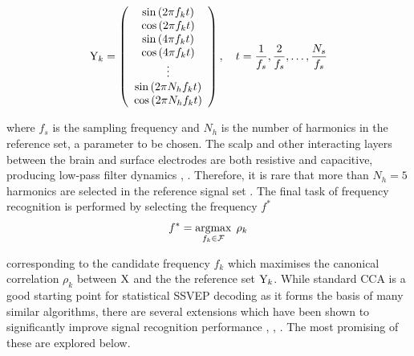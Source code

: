 \begin{equation}
{\textrm{Y}}_{k}=\left(\begin{array}{c}
\sin \left(2 \pi f_{k} t\right) \\
\cos \left(2 \pi f_{k} t\right) \\
\sin \left(4 \pi f_{k} t\right) \\
\cos \left(4 \pi f_{k} t\right) \\
\vdots \\
\sin \left(2 \pi N_h f_{k} t\right) \\
\cos \left(2 \pi N_h f_{k} t\right)
\end{array}\right), \quad t=\frac{1}{f_s}, \frac{2}{f_s}, \ldots, \frac{N_s}{f_s}
\label{eq:sinusoidal-ref}
\end{equation}

where $f_s$ is the sampling frequency and $N_h$ is the number of harmonics in the reference set, a parameter to be chosen. The scalp and other interacting layers between the brain and surface electrodes are both resistive and capacitive, producing low-pass filter dynamics \cite{baillet-em-brain-mapping}, \cite{lin-cca-2006}. Therefore, it is rare that more than $N_h=5$ harmonics are selected in the reference signal set \cite{lin-cca-2006}. The final task of frequency recognition is performed by selecting the frequency $f^*$
\begin{equation}
    f^* = \operatorname*{argmax}_{f_k \in \mathcal{F}} \; \rho_k
    \label{eq:cca-freq-discrimination}
\end{equation}

corresponding to the candidate frequency $f_k$ which maximises the canonical correlation $\rho_k$ between ${\textrm{X}}$ and the the reference set ${\textrm{Y}}_k$. While standard CCA is a good starting point for statistical SSVEP decoding as it forms the basis of many similar algorithms, there are several extensions which have been shown to significantly improve signal recognition performance \cite{zhang-mset-cca}, \cite{sun-gcca}, \cite{miao-hybrid-cca}. The most promising of these are explored below.

